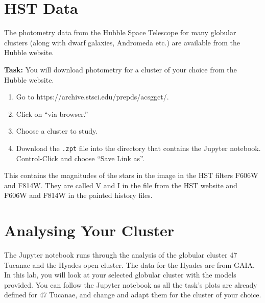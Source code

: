 \documentclass{article}
\begin{document}
\section{HST Data}

The photometry data from the Hubble Space Telescope for many globular clusters (along with dwarf galaxies, Andromeda etc.) are available from the Hubble website.

\textbf{Task:}
You will download photometry for a cluster of your choice from the Hubble website.
\begin{enumerate}
 \setlength\itemsep{0em}
\item Go to https://archive.stsci.edu/prepds/acsggct/.  
\item Click on ``via browser.''
\item Choose a cluster to study.
\item Download the \texttt{.zpt} file into the directory that contains the Jupyter notebook.  Control-Click and choose ``Save Link as''.
\end{enumerate}
This contains the magnitudes of the stars in the image in the HST filters F606W and F814W.  They are called V and I in the file from the HST website and F606W and F814W in the painted history files.

\section{Analysing Your Cluster}

The Jupyter notebook runs through the analysis of the globular cluster 47 Tucanae and the Hyades open cluster.  The data for the Hyades are from GAIA.  In this lab, you will look at your selected globular cluster with the models provided. You can follow the Jupyter notebook as all the task's plots are already defined for 47 Tucanae, and change and adapt them for the cluster of your choice.
\end{document}
